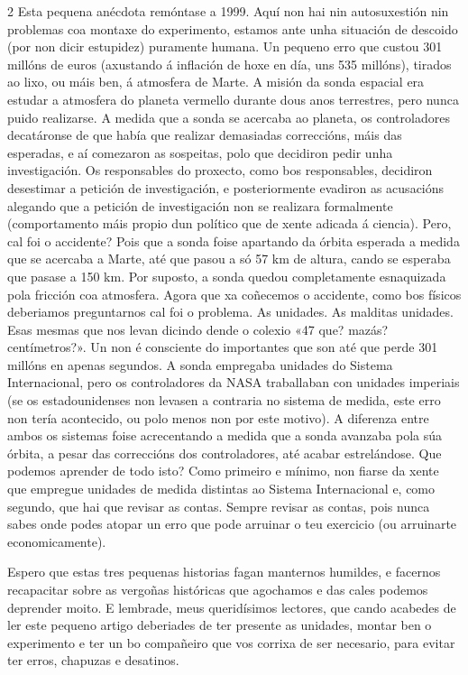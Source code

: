 \begin{multicols}{2}
Esta pequena anécdota remóntase a 1999. Aquí non hai nin autosuxestión nin
problemas coa montaxe do experimento, estamos ante unha situación de descoido
(por non dicir estupidez) puramente humana. Un pequeno erro que custou 301
millóns de euros (axustando á inflación de hoxe en día, uns 535 millóns),
tirados ao lixo, ou máis ben, á atmosfera de Marte. A misión da sonda espacial
era estudar a atmosfera do planeta vermello durante dous anos terrestres, pero
nunca puido realizarse. A medida que a sonda se acercaba ao planeta, os
controladores decatáronse de que había que realizar demasiadas correccións, máis %
das esperadas, e aí comezaron as sospeitas, polo que decidiron pedir unha
investigación. Os responsables do proxecto, como bos responsables, decidiron
desestimar a petición de investigación, e posteriormente evadiron as acusacións
alegando que a petición de investigación non se realizara formalmente
(comportamento máis propio dun político que de xente adicada á ciencia). Pero, %
cal foi o accidente? Pois que a sonda foise apartando da órbita esperada a %
medida que se acercaba a Marte, até que pasou a só 57 km de altura, cando se
esperaba que pasase a 150 km. Por suposto, a sonda quedou completamente
esnaquizada pola fricción coa atmosfera. Agora que xa coñecemos o accidente,
como bos físicos deberiamos preguntarnos cal foi o problema. As unidades. As
malditas unidades. Esas mesmas que nos levan dicindo dende o colexio «47 que?
mazás? centímetros?». Un non é consciente do importantes que son até que perde
301 millóns en apenas segundos. A sonda empregaba unidades do Sistema
Internacional, pero os controladores da NASA traballaban con unidades imperiais
(se os estadounidenses non levasen a contraria no sistema de medida, este erro
non tería acontecido, ou polo menos non por este motivo). A diferenza entre
ambos os sistemas foise acrecentando a medida que a sonda avanzaba pola súa
órbita, a pesar das correccións dos controladores, até acabar estrelándose. Que
podemos aprender de todo isto? Como primeiro e mínimo, non fiarse da xente que
empregue unidades de medida distintas ao Sistema Internacional e, como segundo,
que hai que revisar as contas. Sempre revisar as contas, pois nunca sabes onde
podes atopar un erro que pode arruinar o teu exercicio (ou arruinarte
economicamente). %

Espero que estas tres pequenas historias fagan manternos humildes, e facernos
recapacitar sobre as vergoñas históricas que agochamos e das cales podemos
deprender moito. E lembrade, meus queridísimos lectores, que cando acabedes de
ler este pequeno artigo deberiades de ter presente as unidades, montar ben o
experimento e ter un bo compañeiro que vos corrixa de ser necesario, para
evitar ter erros, chapuzas e desatinos.

\end{multicols}
